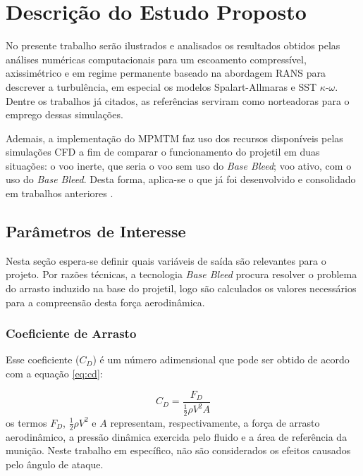 \chapter{Descrição do Estudo Proposto}\label{cap:estudo-proposto}
\graphicspath{{chapter-06/img-cap06/}}

No presente trabalho serão ilustrados e analisados os resultados obtidos pelas análises numéricas computacionais para um escoamento compressível, axissimétrico e em regime permanente baseado na abordagem RANS para descrever a turbulência, em especial os modelos Spalart-Allmaras e SST $\kappa$-$\omega$. Dentre os trabalhos já citados, as referências \cite{Sahu1985,Mahmoud2009,torangatti2basawaraj,belaidouni2016,nicolas-perez_accuracy_2017,Dali2018a,Lucena2020,Reddy2021} serviram como norteadoras para o emprego dessas simulações. 

Ademais, a implementação do MPMTM faz uso dos recursos disponíveis pelas simulações CFD a fim de comparar o funcionamento do projetil em duas situações: o voo inerte, que seria o voo sem uso do \textit{Base Bleed}; voo ativo, com o uso do \textit{Base Bleed}. Desta forma, aplica-se o que já foi desenvolvido e consolidado em trabalhos anteriores \cite{Gauchoux1991,balon2006analysis,Abou-Elela2013,Skande2014,Lim2016,Rosendo2020}.

\section{Parâmetros de Interesse}

Nesta seção espera-se definir quais variáveis de saída são relevantes para o projeto. Por razões técnicas, a tecnologia \textit{Base Bleed} procura resolver o problema do arrasto induzido na base do projetil, logo são calculados os valores necessários para a compreensão desta força aerodinâmica. 

\subsection{Coeficiente de Arrasto}

Esse coeficiente ($C_D$) é um número adimensional que pode ser obtido de acordo com a equação \ref{eq:cd}:

\begin{equation} \label{eq:cd}
    C_{D} = \frac{F_{D}}{\frac{1}{2}\rho V^2 A}
\end{equation}
%
os termos $F_{D}$, $\frac{1}{2}\rho V^2$ e $A$ representam, respectivamente, a força de arrasto aerodinâmico, a pressão dinâmica exercida pelo fluido e a área de referência da munição. Neste trabalho em específico, não são considerados os efeitos causados pelo ângulo de ataque.

